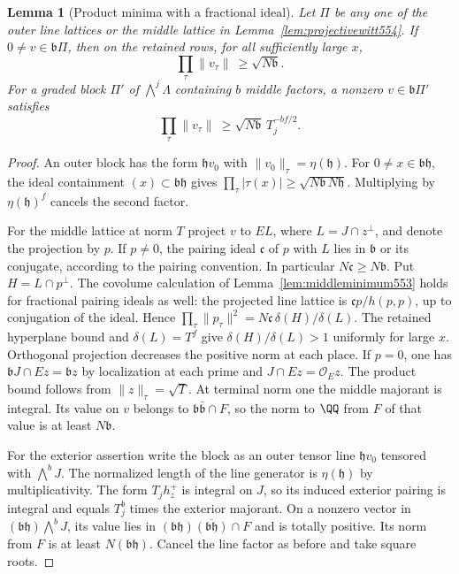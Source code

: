 \documentclass[a4paper,11pt]{article}
\newtheorem{lemma}[proposition]{Lemma}
\theoremstyle{definition}
\theoremstyle{remark}
\numberwithin{equation}{section}
\begin{document}
\begin{lemma}[Product minima with a fractional ideal]
\leavevmode\label{lem:twistedminimum554}
Let \(\Pi\) be any one of the outer line lattices or the middle
lattice in Lemma~\ref{lem:projectivewitt554}. If
\(0\ne v\in\mathfrak b\Pi\), then on the retained rows, for all
sufficiently large \(x\),
\[
                   \prod_{\tau}\|v_\tau\|\ \ge\sqrt{N\mathfrak b}.
\]
For a graded block \(\Pi'\) of \(\bigwedge^j\Lambda\) containing
\(b\) middle factors, a nonzero \(v\in\mathfrak b\Pi'\) satisfies
\[
              \prod_{\tau}\|v_\tau\|
                  \ \ge\sqrt{N\mathfrak b}\,T_j^{-bf/2}.
\]
\end{lemma}
\begin{proof}
An outer block has the form \(\mathfrak h v_0\) with
\(\|v_0\|_\tau=\eta(\mathfrak h)\). For
\(0\ne x\in\mathfrak b\mathfrak h\), the ideal containment
\((x)\subset\mathfrak b\mathfrak h\) gives
\(\prod_\tau|\tau(x)|\ge\sqrt{N\mathfrak b\,N\mathfrak h}\).
Multiplying by \(\eta(\mathfrak h)^f\) cancels the second factor.

For the middle lattice at norm \(T\) project \(v\) to
\(E L\), where \(L=J\cap z^\perp\), and denote the projection
by \(p\). If \(p\ne0\), the pairing ideal \(\mathfrak c\) of
\(p\) with \(L\) lies in \(\mathfrak b\) or its conjugate,
according to the pairing convention. In particular
\(N\mathfrak c\ge N\mathfrak b\). Put \(H=L\cap p^\perp\).
The covolume calculation of Lemma~\ref{lem:middleminimum553}
holds for fractional pairing ideals as well: the projected
line lattice is \(\mathfrak c p/h(p,p)\), up to conjugation
of the ideal. Hence
\(\prod_\tau\|p_\tau\|^2=N\mathfrak c\,\delta(H)/\delta(L)\).
The retained hyperplane bound and \(\delta(L)=T^f\) give
\(\delta(H)/\delta(L)>1\) uniformly for large \(x\).
Orthogonal projection decreases the positive norm at each
place. If \(p=0\), one has
\(\mathfrak bJ\cap Ez=\mathfrak b z\) by localization at each
prime and \(J\cap Ez=\mathcal O_Ez\). The product bound follows
from \(\|z\|_\tau=\sqrt T\). At terminal norm one the middle
majorant is integral. Its value on \(v\) belongs to
\(\mathfrak b\bar{\mathfrak b}\cap F\), so the norm to \(\QQ\)
from \(F\) of that value is at least \(N\mathfrak b\).

For the exterior assertion write the block as an outer tensor
line \(\mathfrak h v_0\) tensored with \(\bigwedge^b J\).
The normalized length of the line generator is
\(\eta(\mathfrak h)\) by multiplicativity. The form
\(T_jh_z^+\) is integral on \(J\), so its induced exterior
pairing is integral and equals \(T_j^b\) times the exterior
majorant. On a nonzero vector in
\((\mathfrak b\mathfrak h)\bigwedge^b J\), its value lies in
\((\mathfrak b\mathfrak h)\overline{(\mathfrak b\mathfrak h)}
\cap F\) and is totally positive. Its norm from \(F\) is at
least \(N(\mathfrak b\mathfrak h)\). Cancel the line factor
as before and take square roots.
\end{proof}
\end{document}

